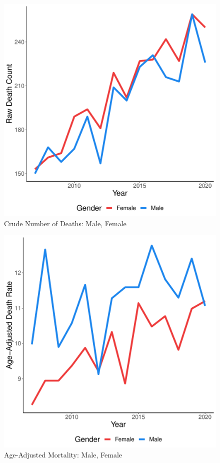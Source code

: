 \documentclass[12pt]{article}
\begin{document}
\begin{figure}
    \centering
    \includegraphics[scale=0.5]{analysis/output/raw_deaths_by_gender_plot.pdf}
    \caption{Crude Number of Deaths: Male, Female}
    \label{fig:crude_deaths_by_gender}
\end{figure}

\begin{figure}
    \centering
    \includegraphics[scale=0.5]{analysis/output/age_adj_deaths_by_gender_plot.pdf}
    \caption{Age-Adjusted Mortality: Male, Female}
    \label{fig:age_adj_deaths_by_gender}
\end{figure}
\end{document}
